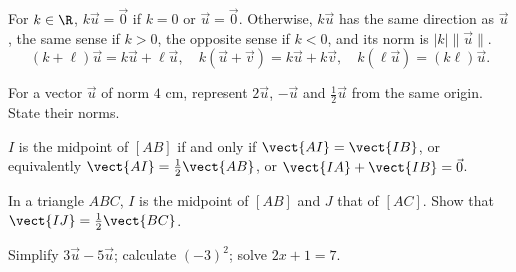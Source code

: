 \begin{keypoint}
For $k\in\R$, $k\vec u=\vec0$ if $k=0$ or $\vec u=\vec0$. Otherwise, $k\vec u$ has the same direction as $\vec u$, the same sense if $k>0$, the opposite sense if $k<0$, and its norm is $|k|\|\vec u\|$.
\[(k+\ell)\vec u=k\vec u+\ell\vec u,\quad k(\vec u+\vec v)=k\vec u+k\vec v,\quad k(\ell\vec u)=(k\ell)\vec u.\]
\end{keypoint}
\begin{example}For a vector $\vec u$ of norm $4$ cm, represent $2\vec u$, $-\vec u$ and $\frac12\vec u$ from the same origin. State their norms.\end{example}
\begin{keypoint}
$I$ is the midpoint of $[AB]$ if and only if $\vect{AI}=\vect{IB}$, or equivalently $\vect{AI}=\frac12\vect{AB}$, or $\vect{IA}+\vect{IB}=\vec0$.
\end{keypoint}
\begin{example}In a triangle $ABC$, $I$ is the midpoint of $[AB]$ and $J$ that of $[AC]$. Show that $\vect{IJ}=\frac12\vect{BC}$.\end{example}
\begin{fluency}[5--10 min]Simplify $3\vec u-5\vec u$; calculate $(-3)^2$; solve $2x+1=7$.\end{fluency}

